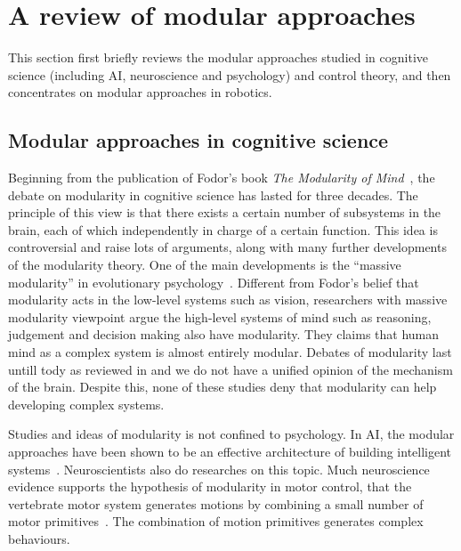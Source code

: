 \section{A review of modular approaches}
\label{cha2:sec3}
This section first briefly reviews the modular approaches studied in cognitive science (including AI, neuroscience and psychology) and control theory, and then concentrates on modular approaches in robotics.

\subsection{Modular approaches in cognitive science}
\label{cha2:sec3:cognitive}

Beginning from the publication of Fodor's book \textit{The Modularity of Mind}~\citep{fodor1983modularity}, the debate on modularity in cognitive science has lasted for three decades. The principle of this view is that there exists a certain number of subsystems in the brain, each of which independently in charge of a certain function. This idea is controversial and raise lots of arguments, along with many further developments of the modularity theory. One of the main developments is the ``massive modularity'' in evolutionary psychology~\citep{samuels2000massively,carruthers2006architecture}.
Different from Fodor's belief that modularity acts in the low-level systems such as vision, researchers with massive modularity viewpoint argue the high-level systems of mind such as reasoning, judgement and decision making also have modularity.
They claims that human mind as a complex system is almost entirely modular. Debates of modularity last untill tody as reviewed in \citet{barrett2006modularity} and we do not have a unified opinion of the mechanism of the brain. Despite this, none of these studies deny that modularity can help developing complex systems.

Studies and ideas of modularity is not confined to psychology. In AI, the modular approaches have been shown to be an effective architecture of building intelligent systems~\citep{bryson2004modular,BrysonMcG12}. Neuroscientists also do researches on this topic. Much neuroscience evidence supports the hypothesis of modularity in motor control, that the vertebrate motor system generates motions by combining a small number of motor primitives~\citep{mussa1994linear,mussa1999modular,bizzi2008combining,grillner2011control}. The combination of motion primitives generates complex behaviours.

